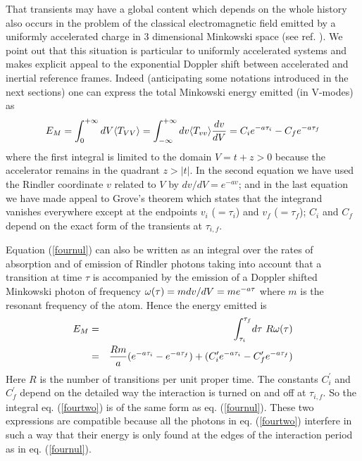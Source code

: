 That transients may have a global content
which
depends on the whole history also occurs in the problem of the classical
electromagnetic field emitted by a uniformly accelerated charge in 3
dimensional Minkowski space (see ref. \cite{Boul2}). We point out that
this situation is
particular to uniformly accelerated systems and makes explicit appeal to the
exponential Doppler shift between accelerated and inertial reference
frames. Indeed (anticipating some notations introduced in the next sections)
one can express the total Minkowski energy emitted (in
V-modes) as \begin{eqnarray}
E_M = \int_0^{+\infty}
dV \langle T_{VV}\rangle
=
\int_{ - \infty}^{+ \infty} dv
\langle T_{vv}\rangle {dv \over dV}
= C_i e^{-a \tau_i}-
C_f e^{-a \tau_f} \label{fournul} \end{eqnarray}
where the first integral
is
limited to the domain $V=t+z>0$ because the accelerator remains in the quadrant
$z>|t|$.
In the second equation we have used the Rindler coordinate $v$
related to $V$ by $dv / dV = e^{-av}$; and in the
last equation we have made appeal to Grove's theorem which states that the
integrand vanishes everywhere except at the endpoints $v_i$ ($= \tau_i $) and
$v_f$ ($= \tau_f $); $C_i$ and $C_f$ depend on the exact form of the
transients at $\tau_{i,f}$.

 Equation (\ref{fournul}) can also be written as an
integral over the rates of absorption and of emission of Rindler
photons taking into account that a transition at time $\tau$ is accompanied by
the emission of a Doppler shifted Minkowski photon of frequency $\mbox{$ \omega $}(\tau) = m
dv/dV=me^{-a\tau}$ where $m$ is the resonant frequency of the atom. Hence the
energy emitted is \begin{eqnarray}
E_M &=& \int_{\tau_i}^{\tau_f}\! d\tau \ R\/
\mbox{$ \omega $}(\tau)
\nonumber\\
&=&{R\/m \over a}( e^{-a \tau_i} - e^{-a\tau_f } ) +( C^\prime_i e^{-a \tau_i}
- C^\prime_f e^{-a \tau_f}
)
\label{fourtwo}
\end{eqnarray}
Here $R$ is the number of transitions per unit proper time.  The constants
$C^\prime_i$ and $C^\prime_f$
 depend on the detailed way the interaction is turned on and off at
$\tau_{i,f}$. So the integral eq. (\ref{fourtwo}) is
of the same form as eq. (\ref{fournul}).  These two   expressions are
compatible because all the photons  in  eq. (\ref{fourtwo}) interfere in such
a way that  their energy is only found at the edges  of
the
interaction period as in eq. (\ref{fournul}).

